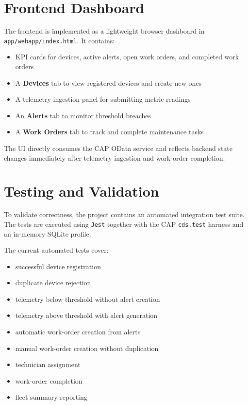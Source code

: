 \documentclass[a4paper,12pt]{article}
\begin{document}
\section{Frontend Dashboard}

The frontend is implemented as a lightweight browser dashboard in \texttt{app/webapp/index.html}. It contains:

\begin{itemize}[leftmargin=1.5em, itemsep=4pt]
  \item KPI cards for devices, active alerts, open work orders, and completed work orders
  \item A \textbf{Devices} tab to view registered devices and create new ones
  \item A telemetry ingestion panel for submitting metric readings
  \item An \textbf{Alerts} tab to monitor threshold breaches
  \item A \textbf{Work Orders} tab to track and complete maintenance tasks
\end{itemize}

The UI directly consumes the CAP OData service and reflects backend state changes immediately after telemetry ingestion and work-order completion.

\section{Testing and Validation}

To validate correctness, the project contains an automated integration test suite. The tests are executed using \texttt{Jest} together with the CAP \texttt{cds.test} harness and an in-memory SQLite profile.

The current automated tests cover:

\begin{itemize}[leftmargin=1.5em, itemsep=3pt]
  \item successful device registration
  \item duplicate device rejection
  \item telemetry below threshold without alert creation
  \item telemetry above threshold with alert generation
  \item automatic work-order creation from alerts
  \item manual work-order creation without duplication
  \item technician assignment
  \item work-order completion
  \item fleet summary reporting
\end{itemize}
\end{document}
